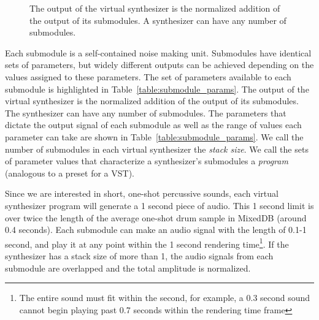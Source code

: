 \documentclass[\main/thesis.tex]{subfiles}
\begin{document}
 \begin{figure}[htbp]
    \begin{center}
    \end{center}
    \caption{The output of the virtual synthesizer is the normalized addition of the output of its submodules. A synthesizer can have any number of submodules. 
    }
\label{fig:synth_modules}
\end{figure}
 Each submodule is a self-contained noise making unit. Submodules have identical sets of parameters, but widely different outputs can be achieved depending on the values assigned to these parameters. The set of parameters available to each submodule is highlighted in Table~\ref{table:submodule_params}. The output of the virtual synthesizer is the normalized addition of the output of its submodules. The synthesizer can have any number of submodules. The parameters that dictate the output signal of each submodule as well as the range of values each parameter can take are shown in Table~\ref{table:submodule_params}. We call the number of submodules in each virtual synthesizer the \textit{stack size}. We call the sets of parameter values that characterize a synthesizer's submodules a \textit{program} (analogous to a preset for a VST).  

Since we are interested in short, one-shot percussive sounds, each virtual synthesizer program will generate a 1 second piece of audio. This 1 second limit is over twice the length of the average one-shot drum sample in MixedDB (around 0.4 seconds). Each submodule can make an audio signal with the length of 0.1-1 second, and play it at any point within the 1 second rendering time\footnote{The entire sound must fit within the second, for example, a 0.3 second sound cannot begin playing past 0.7 seconds within the rendering time frame}. If the synthesizer has a stack size of more than 1, the audio signals from each submodule are overlapped and the total amplitude is normalized.
\end{document}
